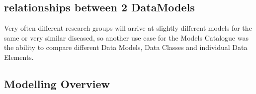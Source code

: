 \subsection{relationships between 2 DataModels}
Very often different research groups will arrive at slightly different models for the same or very similar diseased, so another use case for the Models Catalogue was the ability to compare different Data Models, Data Classes and individual Data Elements.






\subsection{Modelling Overview}





 
 
